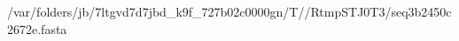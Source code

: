 \documentclass[10pt]{article}
\begin{document}
\begin{texshade}{/var/folders/jb/7ltgvd7d7jbd_k9f_727b02c0000gn/T//RtmpSTJ0T3/seq3b2450c2672e.fasta}
\hidelogoscale
{}
\showlegend
\end{texshade}
\end{document}
